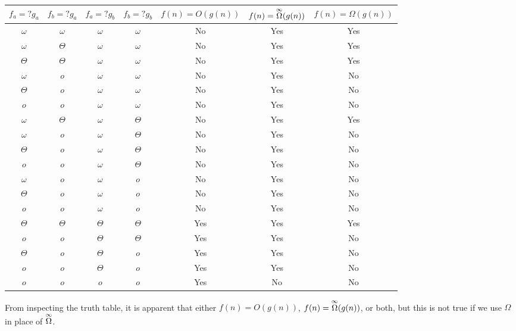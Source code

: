 \noindent\begin{tabular}{c c c c|c|c|c}
	$f_a = ?g_a$ & $f_b = ?g_a$ & $f_a = ?g_b$ & $f_b = ?g_b$ & $f(n) = O(g(n))$ & $f(n) = \overset{\small\infty}{\Omega}(g(n))$ & $f(n) = \Omega(g(n))$ \\ \hline
	{\color{Gray}$\omega$} & $\omega$ & {\color{Gray}$\omega$} & {\color{Gray}$\omega$} & {\color{Red}No} & {\color{Green}Yes} & {\color{Green}Yes} \\
	$\omega$ & $\Theta$ & {\color{Gray}$\omega$} & $\omega$ & {\color{Red}No} & {\color{Green}Yes} & {\color{Green}Yes} \\
	$\Theta$ & $\Theta$ & {\color{Gray}$\omega$} & $\omega$ & {\color{Red}No} & {\color{Green}Yes} & {\color{Green}Yes} \\
	$\omega$ & $o$ & {\color{Gray}$\omega$} & $\omega$ & {\color{Red}No} & {\color{Green}Yes} & {\color{Red}No} \\
	$\Theta$ & $o$ & {\color{Gray}$\omega$} & $\omega$ & {\color{Red}No} & {\color{Green}Yes} & {\color{Red}No} \\
	$o$ & {\color{Gray}$o$} & {\color{Gray}$\omega$} & $\omega$ & {\color{Red}No} & {\color{Green}Yes} & {\color{Red}No} \\
	$\omega$ & $\Theta$ & $\omega$ & $\Theta$ & {\color{Red}No} & {\color{Green}Yes} & {\color{Green}Yes} \\
	$\omega$ & $o$ & $\omega$ & $\Theta$ & {\color{Red}No} & {\color{Green}Yes} & {\color{Red}No} \\
	$\Theta$ & $o$ & $\omega$ & $\Theta$ & {\color{Red}No} & {\color{Green}Yes} & {\color{Red}No} \\
	$o$ & {\color{Gray}$o$} & $\omega$ & $\Theta$ & {\color{Red}No} & {\color{Green}Yes} & {\color{Red}No} \\
	$\omega$ & {\color{Gray}$o$} & $\omega$ & $o$ & {\color{Red}No} & {\color{Green}Yes} & {\color{Red}No} \\
	$\Theta$ & {\color{Gray}$o$} & $\omega$ & $o$ & {\color{Red}No} & {\color{Green}Yes} & {\color{Red}No} \\
	$o$ & {\color{Gray}$o$} & $\omega$ & $o$ & {\color{Red}No} & {\color{Green}Yes} & {\color{Red}No} \\
	$\Theta$ & $\Theta$ & $\Theta$ & $\Theta$ & {\color{Green}Yes} & {\color{Green}Yes} & {\color{Green}Yes} \\
	$o$ & {\color{Gray}$o$} & $\Theta$ & $\Theta$ & {\color{Green}Yes} & {\color{Green}Yes} & {\color{Red}No} \\
	$\Theta$ & {\color{Gray}$o$} & $\Theta$ & $o$ & {\color{Green}Yes} & {\color{Green}Yes} & {\color{Red}No} \\
	$o$ & {\color{Gray}$o$} & $\Theta$ & $o$ & {\color{Green}Yes} & {\color{Green}Yes} & {\color{Red}No} \\
	{\color{Gray}$o$} & {\color{Gray}$o$} & $o$ & {\color{Gray}$o$} & {\color{Green}Yes} & {\color{Red}No} & {\color{Red}No} \\
\end{tabular}
From inspecting the truth table, it is apparent that either $f(n) = O(g(n))$, $f(n) = \overset{\small\infty}{\Omega}(g(n))$, or both, but this is not true if we use $\Omega$ in place of $\overset{\small\infty}{\Omega}$.

